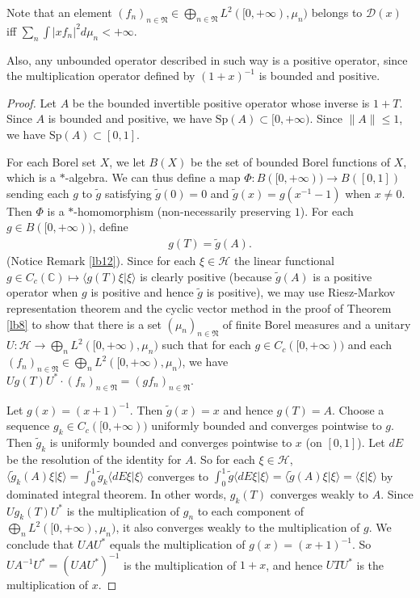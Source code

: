 \documentclass[12pt,a4paper,notitlepage]{article}
\theoremstyle{definition}
\theoremstyle{plain}
\newcommand{\fk}{\mathfrak}
\newcommand{\mc}{\mathcal}
\newcommand{\wtd}{\widetilde}
\newcommand{\Dom}{\scr D}
\newcommand{\bk}[1]{\langle {#1}\rangle}
\newcommand{\scr}{\mathscr}
\newcommand{\Cbb}{\mathbb C}
\newcommand{\Sp}{\mathrm{Sp}}
\numberwithin{equation}{section}
\begin{document}
Note that an element $(f_n)_{n\in\fk N}\in \bigoplus_{n\in\fk N} L^2([0,+\infty),\mu_n)$ belongs to $\Dom(x)$ iff $\sum_n\int |xf_n|^2d\mu_n<+\infty$.







Also, any unbounded operator described in such way is a positive operator, since the multiplication operator defined by $(1+x)^{-1}$ is bounded and positive.


\begin{proof}
Let $A$ be the bounded invertible positive operator whose inverse is $1+T$. Since $A$ is bounded and positive, we have $\Sp(A)\subset[0,+\infty)$. Since $\lVert A\lVert\leq 1$, we have $\Sp(A)\subset[0,1]$.  

For each Borel set $X$, we let $B(X)$ be the set of bounded Borel functions of $X$, which is a $*$-algebra. We can thus define a map $\Phi:B([0,+\infty))\rightarrow B([0,1])$ sending each $g$ to $\wtd g$ satisfying $\wtd g(0)=0$ and  $\wtd g(x)=g(x^{-1}-1)$ when $x\neq0$. Then $\Phi$ is a $*$-homomorphism (non-necessarily preserving $1$). For each $g\in B([0,+\infty))$, define
\begin{align*}
g(T)=\wtd g(A).	
\end{align*}
(Notice Remark \ref{lb12}). Since for each $\xi\in\mc H$ the linear functional $g\in C_c(\Cbb)\mapsto \bk{g(T)\xi|\xi}$ is clearly positive (because $\wtd g(A)$ is a positive operator when $g$ is positive and hence $\wtd g$ is positive), we may use Riesz-Markov representation theorem and the cyclic vector method in the proof of Theorem \ref{lb8} to show that there is a set $(\mu_n)_{n\in\fk N}$ of finite Borel measures  and a unitary $U:\mc H\rightarrow\bigoplus_n L^2([0,+\infty),\mu_n)$ such that for each $g\in C_c([0,+\infty))$ and each $(f_n)_{n\in\fk N}\in \bigoplus_n L^2([0,+\infty),\mu_n)$, we have $Ug(T)U^*\cdot (f_n)_{n\in\fk N}=(gf_n)_{n\in\fk N}$.

Let $g(x)=(x+1)^{-1}$. Then $\wtd g(x)=x$ and hence $g(T)=A$. Choose a sequence $g_k\in C_c([0,+\infty))$ uniformly bounded and converges pointwise to $g$.  Then $\wtd g_k$ is uniformly bounded and converges pointwise to $x$ (on $[0,1]$). Let $dE$ be the resolution of the identity for $A$.  So for each $\xi\in\mc H$, $\bk{\wtd g_k(A)\xi|\xi}=\int_0^1\wtd g_k\bk{dE\xi|\xi}$ converges to $\int_0^1\wtd g\bk{dE\xi|\xi}=\bk{\wtd g(A)\xi|\xi}=\bk{\xi|\xi}$ by dominated integral theorem. In other words, $g_k(T)$ converges weakly to $A$. Since $Ug_k(T)U^*$ is the multiplication of $g_n$ to each component of $\bigoplus_n L^2([0,+\infty),\mu_n)$, it also converges weakly to the multiplication of $g$. We conclude that $UAU^*$ equals the multiplication of $g(x)=(x+1)^{-1}$. So $UA^{-1}U^*=(UAU^*)^{-1}$ is the multiplication of $1+x$, and hence $UTU^*$ is the multiplication of $x$.
\end{proof}
\end{document}
